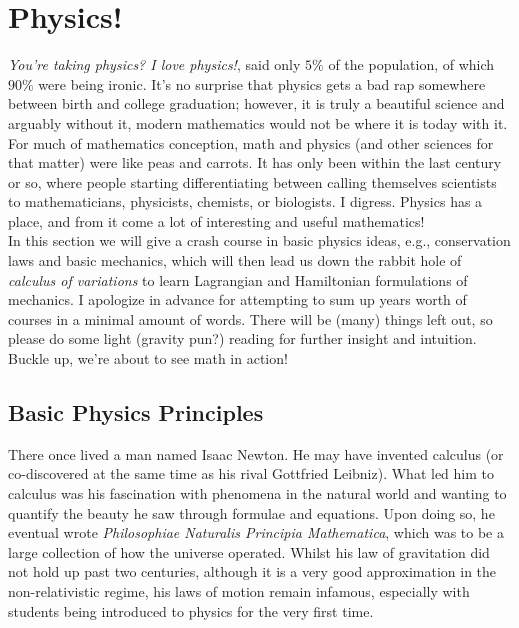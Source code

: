 \graphicspath{{./Physics/}}

\section{Physics!}

\emph{You're taking physics? I love physics!}, said only $5\%$ of the population, of which $90\%$ were being ironic. It's no surprise that physics gets a bad rap somewhere between birth and college graduation; however, it is truly a beautiful science and arguably without it, modern mathematics would not be where it is today with it. For much of mathematics conception, math and physics (and other sciences for that matter) were like peas and carrots. It has only been within the last century or so, where people starting differentiating between calling themselves scientists to mathematicians, physicists, chemists, or biologists. I digress. Physics has a place, and from it come a lot of interesting and useful mathematics!\\

In this section we will give a crash course in basic physics ideas, e.g., conservation laws and basic mechanics, which will then lead us down the rabbit hole of \emph{calculus of variations} to learn Lagrangian and Hamiltonian formulations of mechanics. I apologize in advance for attempting to sum up years worth of courses in a minimal amount of words. There will be (many) things left out, so please do some light (gravity pun?) reading for further insight and intuition. Buckle up, we're about to see math in action!\\


%
%

\subsection{Basic Physics Principles}

There once lived a man named Isaac Newton. He may have invented calculus (or co-discovered at the same time as his rival Gottfried Leibniz). What led him to calculus was his fascination with phenomena in the natural world and wanting to quantify the beauty he saw through formulae and equations. Upon doing so, he eventual wrote \emph{Philosophiae Naturalis Principia Mathematica}, which was to be a large collection of how the universe operated. Whilst his law of gravitation did not hold up past two centuries, although it is a very good approximation in the non-relativistic regime, his laws of motion remain infamous, especially with students being introduced to physics for the very first time. \\

